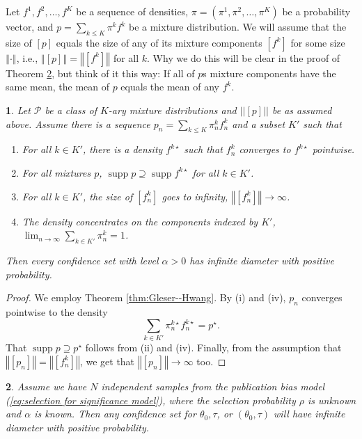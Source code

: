 \documentclass[article]{ajs}
\numberwithin{equation}{section}
\numberwithin{figure}{section}
\theoremstyle{plain}
\newtheorem{thm}{\protect\theoremname}
\theoremstyle{definition}
\theoremstyle{definition}
\theoremstyle{plain}
\newtheorem{lem}[thm]{\protect\lemmaname}
\providecommand{\lemmaname}{Lemma}
\providecommand{\theoremname}{Theorem}
\DeclareMathOperator{\supp}{supp}
\begin{document}
Let $f^{1},f^{2},\ldots,f^{K}$ be a sequence of densities, $\pi=(\pi^{1},\pi^{2},\ldots,\pi^{K})$
be a probability vector, and $p=\sum_{k\leq K}\pi^{k}f^{k}$ be a mixture distribution. We will assume that the size of $[p]$ equals the size of any of its mixture components $[f^{k}]$ for some size $\left\Vert \cdot\right\Vert $,
i.e., $\left\Vert [p]\right\Vert =\left\Vert [f^{k}]\right\Vert $
for all $k$. Why we do this will be clear in the proof of Theorem
\ref{thm:general publication bias}, but think of it this way: If
all of $p$s mixture components have the same mean, the mean of $p$
equals the mean of any $f^{k}$. 
\begin{lem}
\label{prop:Mixture model corollary} Let $\mathcal{P}$ be a class
of $K$-ary mixture distributions and $||[p]||$ be as assumed above. Assume there is a sequence $p_{n}=\sum_{k\leq K}\pi_{n}^{k}f_{n}^{k}$
and a subset $K'$ such that 
\begin{enumerate}
\item For all $k\in K'$, there is a density $f^{k\star}$ such that $f_{n}^{k}$
converges to $f^{k\star}$ pointwise.
\item For all mixtures $p$, $\supp p\supseteq\supp f^{k\star}$ for all
$k\in K'$.
\item For all $k\in K'$, the size of $[f_{n}^{k}]$ goes to infinity, $\left\Vert [f_{n}^{k}]\right\Vert \to\infty$.
\item The density concentrates on the components indexed by $K'$, $\lim_{n\to\infty}\sum_{k\in K'}\pi_{n}^{k}=1$.
\end{enumerate}
Then every confidence set with level $\alpha>0$ has infinite diameter
with positive probability.
\end{lem}

\begin{proof}
We employ Theorem \ref{thm:Gleser--Hwang}. By (i) and (iv), $p_{n}$
converges pointwise to the density $$\sum_{k\in K'}\pi_{n}^{k\star}f_{n}^{k\star}=p^{\star}.$$
That $\supp p\supseteq p^{\star}$ follows from (ii) and (iv). Finally,
from the assumption that$\left\Vert [p_{n}]\right\Vert =\left\Vert [f_{n}^{k}]\right\Vert $,
we get that $\left\Vert [p_{n}]\right\Vert \to\infty$ too. 
\end{proof}
\begin{thm}
\label{thm:general publication bias} Assume we have $N$ independent samples from the publication bias model (\ref{eq:selection for significance model}), where the selection probability $\rho$ is unknown and $\alpha$ is known. Then any confidence set for $\theta_{0},\tau$, or $(\theta_{0},\tau)$ will have infinite diameter with positive probability.
\end{thm}
\end{document}
